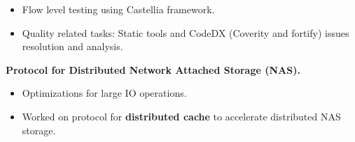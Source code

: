 \begin{itemize}
\begin{itemize}
	 \item Flow level testing using Castellia framework.\\[-0.5cm]
	 \item Quality related tasks: Static tools and CodeDX (Coverity and fortify) issues resolution and analysis.\\[-0.5cm]
	\end{itemize}
	\textbf{Protocol for Distributed Network Attached Storage (NAS).}\\[-0.6cm]
	\begin{itemize}
	\item Optimizations for large IO operations.
	\item Worked on protocol for \textbf{distributed cache} to accelerate distributed NAS storage.\\[-0.6cm]
	\end{itemize}
\end{itemize}
